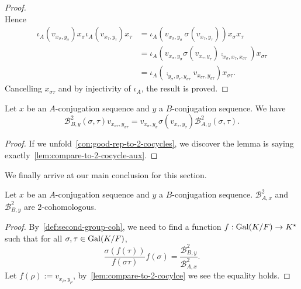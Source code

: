 \begin{proof}
\[  \]
  Hence
  \[
    \begin{aligned}    \iota_{A}\left(v_{x_{\sigma},y_{\sigma}}\right)x_{\sigma}\iota_{A}\left(v_{x_{\tau},y_{\tau}}\right)x_{\tau} &=
                                                                                                                                      \iota_{A}\left(v_{x_{\sigma},y_{\sigma}}\, \sigma\left(v_{x_{\tau},y_{\tau}}\right)\right) x_{\sigma}x_{\tau} \\
      &= \iota_{A}\left(v_{x_{\sigma},y_{\sigma}}\sigma\left(v_{x_{\tau},y_{\tau}}\right)\comp_{x_{\sigma},x_{\tau},x_{\sigma\tau}}\right)x_{\sigma\tau}\\
      &= \iota_{A}\left(\comp_{y_{\sigma},y_{\tau},y_{\sigma\tau}}v_{x_{\sigma\tau},y_{\sigma\tau}}\right)x_{\sigma\tau}.
    \end{aligned}
  \]
  Cancelling $x_{\sigma\tau}$ and by injectivity of $\iota_{A}$, the result is proved.
\end{proof}

\begin{lemma}\label{lem:compare-to-2-cocylce}
  Let $x$ be an $A$-conjugation sequence and $y$ a $B$-conjugation sequence. We have
  \[
    \mathcal{B}^{2}_{B,y}(\sigma,\tau) v_{x_{\sigma\tau},y_{\sigma\tau}} =
    v_{x_{\sigma},y_{\sigma}} \sigma\left(v_{x_{\tau},y_{\tau}}\right) \mathcal{B}^{2}_{A,y}(\sigma,\tau).
  \]
  \leanok
\end{lemma}

\begin{proof}
  If we unfold~\cref{con:good-rep-to-2-cocycles}, we discover the lemma is saying exactly~\cref{lem:compare-to-2-cocycle-aux}.
\end{proof}

We finally arrive at our main conclusion for this section.
\begin{corollary}\label{cor:to-2-cocylce-wd}
  Let $x$ be an $A$-conjugation sequence and $y$ a $B$-conjugation sequence. $\mathcal{B}^{2}_{A,x}$ and $\mathcal{B}^{2}_{B,y}$ are 2-cohomologous.
  \leanok
\end{corollary}
\begin{proof}
  By~\cref{def:second-group-coh}, we need to find a function $f : \operatorname{Gal}(K/F)\to K^{\star}$ such that for all $\sigma, \tau\in\operatorname{Gal}(K/F)$,
  \[
    \frac{\sigma\left(f(\tau)\right)}{f\left(\sigma\tau\right)}f(\sigma)=\frac{\mathcal{B}^{2}_{B,y}}{\mathcal{B}^{2}_{A,x}}.
  \]
  Let $f(\rho) := v_{x_{\rho},y_{\rho}}$, by~\cref{lem:compare-to-2-cocylce} we see the equality holds.
\end{proof}

